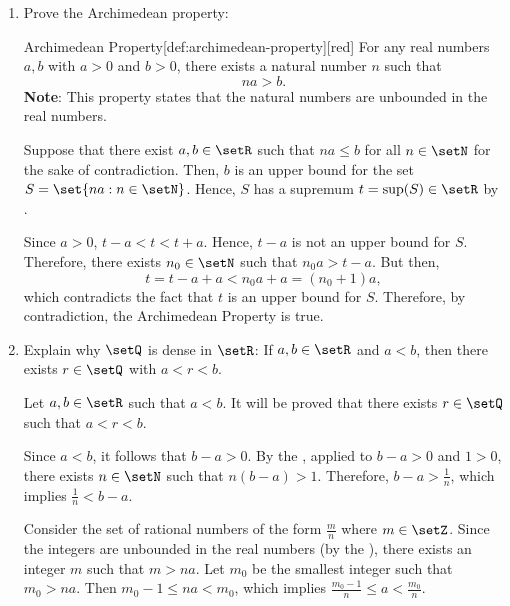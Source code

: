\begin{enumerate}
    
  \item Prove the Archimedean property:

  \begin{define}{Archimedean Property}[def:archimedean-property][red]
    For any real numbers \(a, b\) with \(a>0\) and \(b>0\), there exists 
    a natural number \(n\) such that 
    \[
    na > b.
    \]
    \textbf{Note}: This property states that the natural numbers are unbounded in the real numbers.
  \end{define}
  \begin{subprove}
    Suppose that there exist \(a, b \in \setR\) such that \(na \le b\) for all \(n \in \setN\) 
    for the sake of contradiction.
    Then, \(b\) is an upper bound for the set \(S = \set{na : n \in \setN}\).
    Hence, \(S\) has a supremum \(t=\sup(S) \in \setR\) by .

    Since $a>0$, $t - a < t < t + a$. Hence, $t-a$ is not an upper bound for \(S\).
    Therefore, there exists \(n_0 \in \setN\) such that \(n_0 a > t - a\). But then, 
    \[
      t = t - a + a < n_0 a + a = (n_0 + 1)a,
    \]
    which contradicts the fact that \(t\) is an upper bound for \(S\).
    Therefore, by contradiction, the Archimedean Property is true.
  \end{subprove}

  \item Explain why \(\setQ\) is dense in \(\setR\):
    If \(a,b\in\setR\) and \(a<b\), then there exists \(r\in\setQ\) with \(a<r<b\).
    \begin{subprove}
      Let \(a, b \in \setR\) such that \(a < b\).
      It will be proved that there exists \(r \in \setQ\) such that \(a < r < b\).
      
      Since \(a < b\), it follows that \(b - a > 0\).
      By the , applied to \(b - a > 0\) and \(1 > 0\), 
      there exists \(n \in \setN\) such that \(n(b - a) > 1\).
      Therefore, \(b - a > \frac{1}{n}\), which implies \(\frac{1}{n} < b - a\).
      
      Consider the set of rational numbers of the form \(\frac{m}{n}\) where \(m \in \setZ\).
      Since the integers are unbounded in the real numbers (by the ), 
      there exists an integer \(m\) such that \(m > na\).
      Let \(m_0\) be the smallest integer such that \(m_0 > na\).
      Then \(m_0 - 1 \le na < m_0\), which implies \(\frac{m_0 - 1}{n} \le a < \frac{m_0}{n}\).
      

\end{subprove}
\end{enumerate}
